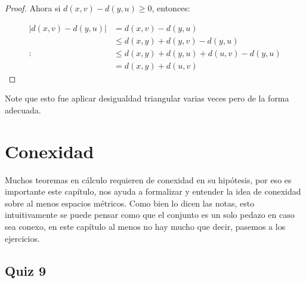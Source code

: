 \begin{itemize}[leftmargin=*]
\begin{proof}
Ahora si $d(x,v)-d(y,u)\geq0$, entonces:

\begin{align*}
|d(x,v)-d(y,u)|&=d(x,v)-d(y,u)\\
&\leq d(x,y)+d(y,v)-d(y,u)\\ :
&\leq d(x,y)+d(y,u)+d(u,v)-d(y,u)\\
&=d(x,y)+d(u,v)
\end{align*}
\end{proof}

\begin{note}
Note que esto fue aplicar desigualdad triangular varias veces pero de la forma adecuada.
\end{note}

\end{itemize}

\section{Conexidad}

\begin{note}
Muchos teoremas en cálculo requieren de conexidad en su hipótesis, por eso es importante este capítulo, nos ayuda a formalizar y entender la idea de conexidad sobre al menos espacios métricos. Como bien lo dicen las notas, esto intuitivamente se puede pensar como que el conjunto es un solo pedazo en caso sea conexo, en este capítulo al menos no hay mucho que decir, pasemos a los ejercicios.
\end{note}

\subsection{Quiz 9}

